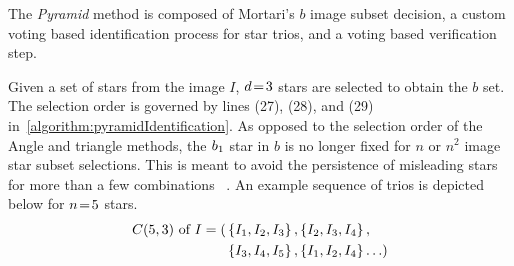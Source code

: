 \begin{algorithm}
\end{algorithm}

The \textit{Pyramid} method is composed of Mortari's $b$ image subset decision, a custom voting based identification
process for star trios, and a voting based verification step.

Given a set of stars from the image $I$, $d \!=\! 3$ stars are selected to obtain the $b$ set.
The selection order is governed by lines (27), (28), and (29) in~\autoref{algorithm:pyramidIdentification}.
As opposed to the selection order of the Angle and triangle methods, the $b_1$ star in $b$ is no longer fixed
for $n$ or $n^2$ image star subset selections.
This is meant to avoid the persistence of misleading stars for more than a few combinations
~\cite{mortari:pyramidIdentification}.
An example sequence of trios is depicted below for $n \!=\! 5$ stars.
\begin{equation}
    \begin{aligned}
        C(5, 3) \text{ of } I = ( &\left\{ I_1, I_2, I_3 \right\}, \left\{ I_2, I_3, I_4 \right\}, \\
        &\left\{ I_3, I_4, I_5 \right\}, \left\{ I_1, I_2, I_4  \right\}\ldots )
    \end{aligned}
\end{equation}

